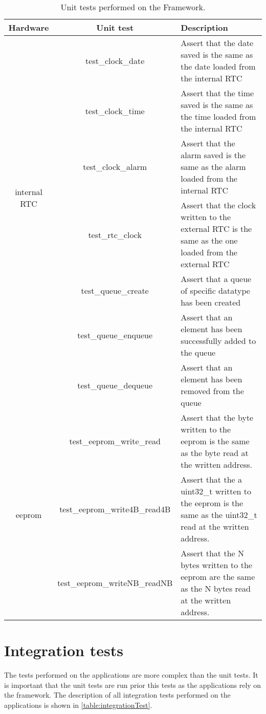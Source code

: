 \begin{table}[h!]
	\centering
	\caption{Unit tests performed on the Framework.}
	\label{table:unitTest}
	\begin{tabular}{ccp{18em}}
		\hline
		\hline
		\toprule
		\textbf{Hardware} & \textbf{Unit test} & \textbf{Description}\\
		\bottomrule
		\toprule
		\multirow{6}{*}{internal RTC} & test\_clock\_date & Assert that the date saved is the same as the date loaded from the internal RTC\\
		& test\_clock\_time & Assert that the time saved is the same as the time loaded from the internal RTC\\ 
		& test\_clock\_alarm & Assert that the alarm saved is the same as the alarm loaded from the internal RTC\\
		\midrule
		\multirow{3}{*}{external RTC} & test\_rtc\_clock & Assert that the clock written to the external RTC is the same as the one loaded from the external RTC\\
		\midrule
		\multirow{6}{*}{queue} & test\_queue\_create & Assert that a queue of specific datatype has been created\\
		& test\_queue\_enqueue & Assert that an element has been successfully added to the queue\\ 
		& test\_queue\_dequeue & Assert that an element has been removed from the queue\\
		\midrule
		\multirow{9}{*}{eeprom} & test\_eeprom\_write\_read & Assert that the byte written to the eeprom is the same as the byte read at the written address.\\
		& test\_eeprom\_write4B\_read4B & Assert that the a uint32\_t written to the eeprom is the same as the uint32\_t read at the written address.\\
		& test\_eeprom\_writeNB\_readNB & Assert that the N bytes written to the eeprom are the same as the N bytes read at the written address.\\
		\bottomrule
		\hline
		\hline
	\end{tabular}
\end{table}

\section{Integration tests}
The tests performed on the applications are more complex than the unit tests. It is important that the unit tests are run prior this tests as the applications rely on the framework. The description of all integration tests performed on the applications is shown in \cref{table:integrationTest}. 

